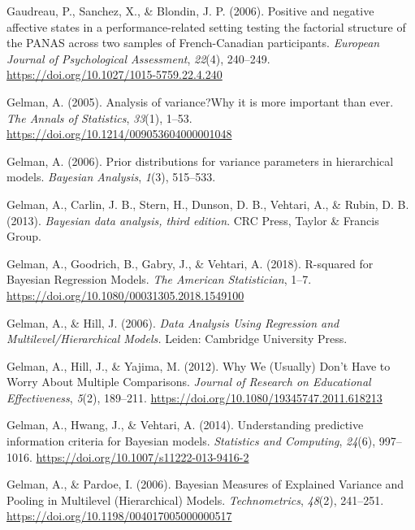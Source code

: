 \documentclass[a4paper,12pt,twoside,openright,oldfontcommands,final]{memoir}
\begin{document}
\leavevmode\hypertarget{ref-Gaudreau2006}{}%
Gaudreau, P., Sanchez, X., \& Blondin, J. P. (2006). Positive and negative affective states in a performance-related setting testing the factorial structure of the PANAS across two samples of French-Canadian participants. \emph{European Journal of Psychological Assessment}, \emph{22}(4), 240--249. \url{https://doi.org/10.1027/1015-5759.22.4.240}

\leavevmode\hypertarget{ref-gelman_analysis_2005}{}%
Gelman, A. (2005). Analysis of variance?Why it is more important than ever. \emph{The Annals of Statistics}, \emph{33}(1), 1--53. \url{https://doi.org/10.1214/009053604000001048}

\leavevmode\hypertarget{ref-gelman_prior_2006}{}%
Gelman, A. (2006). Prior distributions for variance parameters in hierarchical models. \emph{Bayesian Analysis}, \emph{1}(3), 515--533.

\leavevmode\hypertarget{ref-gelman_bayesian_2013}{}%
Gelman, A., Carlin, J. B., Stern, H., Dunson, D. B., Vehtari, A., \& Rubin, D. B. (2013). \emph{Bayesian data analysis, third edition}. CRC Press, Taylor \& Francis Group.

\leavevmode\hypertarget{ref-gelman_r-squared_2018}{}%
Gelman, A., Goodrich, B., Gabry, J., \& Vehtari, A. (2018). R-squared for Bayesian Regression Models. \emph{The American Statistician}, 1--7. \url{https://doi.org/10.1080/00031305.2018.1549100}

\leavevmode\hypertarget{ref-gelman_data_2006}{}%
Gelman, A., \& Hill, J. (2006). \emph{Data Analysis Using Regression and Multilevel/Hierarchical Models.} Leiden: Cambridge University Press.

\leavevmode\hypertarget{ref-gelman_why_2012}{}%
Gelman, A., Hill, J., \& Yajima, M. (2012). Why We (Usually) Don't Have to Worry About Multiple Comparisons. \emph{Journal of Research on Educational Effectiveness}, \emph{5}(2), 189--211. \url{https://doi.org/10.1080/19345747.2011.618213}

\leavevmode\hypertarget{ref-gelman_understanding_2014}{}%
Gelman, A., Hwang, J., \& Vehtari, A. (2014). Understanding predictive information criteria for Bayesian models. \emph{Statistics and Computing}, \emph{24}(6), 997--1016. \url{https://doi.org/10.1007/s11222-013-9416-2}

\leavevmode\hypertarget{ref-gelman_bayesian_2006}{}%
Gelman, A., \& Pardoe, I. (2006). Bayesian Measures of Explained Variance and Pooling in Multilevel (Hierarchical) Models. \emph{Technometrics}, \emph{48}(2), 241--251. \url{https://doi.org/10.1198/004017005000000517}
\end{document}

